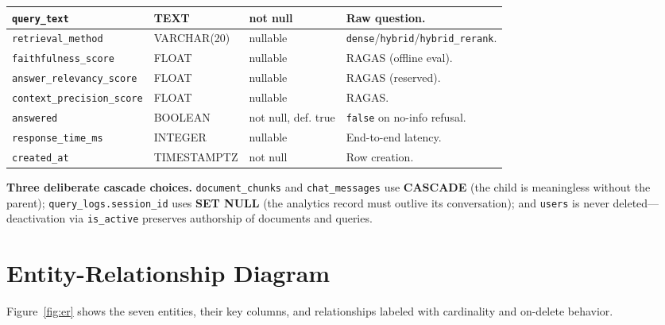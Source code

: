 \documentclass[11pt,a4paper,oneside]{report}
\newcommand{\code}[1]{\texttt{#1}}
\begin{document}
\begin{small}
\begin{longtable}{|L{2.7cm}|L{2.2cm}|L{2.55cm}|L{6.05cm}|}
\code{query\_text} & TEXT & not null & Raw question.\\ \hline
\code{retrieval\_method} & VARCHAR(20) & nullable & \code{dense}/\code{hybrid}/\code{hybrid\_rerank}.\\ \hline
\code{faithfulness\_score} & FLOAT & nullable & RAGAS (offline eval).\\ \hline
\code{answer\_relevancy\_score} & FLOAT & nullable & RAGAS (reserved).\\ \hline
\code{context\_precision\_score} & FLOAT & nullable & RAGAS.\\ \hline
\code{answered} & BOOLEAN & not null, def. true & \code{false} on no-info refusal.\\ \hline
\code{response\_time\_ms} & INTEGER & nullable & End-to-end latency.\\ \hline
\code{created\_at} & TIMESTAMPTZ & not null & Row creation.\\ \hline
\end{longtable}
\end{small}

\begin{keyidea}
\textbf{Three deliberate cascade choices.} \code{document\_chunks} and \code{chat\_messages} use
\textbf{CASCADE} (the child is meaningless without the parent); \code{query\_logs.session\_id}
uses \textbf{SET NULL} (the analytics record must outlive its conversation); and \code{users} is
never deleted---deactivation via \code{is\_active} preserves authorship of documents and queries.
\end{keyidea}

\section{Entity-Relationship Diagram}
Figure~\ref{fig:er} shows the seven entities, their key columns, and relationships labeled with
cardinality and on-delete behavior.
\end{document}
